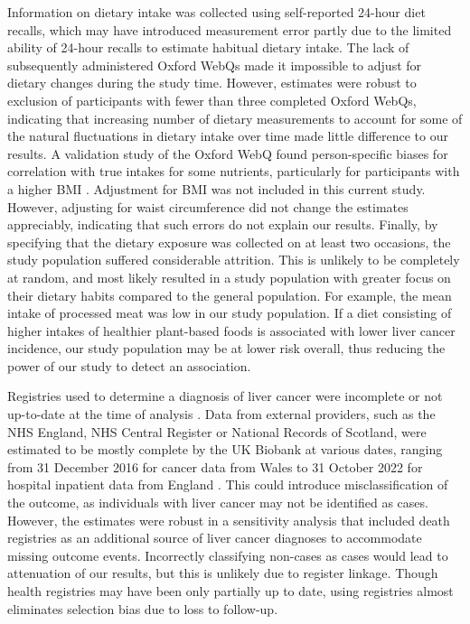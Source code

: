 \documentclass[
]{article}
\begin{document}
Information on dietary intake was collected using self-reported 24-hour
diet recalls, which may have introduced measurement error partly due to
the limited ability of 24-hour recalls to estimate habitual dietary
intake. The lack of subsequently administered Oxford WebQs made it
impossible to adjust for dietary changes during the study time. However,
estimates were robust to exclusion of participants with fewer than three
completed Oxford WebQs, indicating that increasing number of dietary
measurements to account for some of the natural fluctuations in dietary
intake over time made little difference to our results. A validation
study of the Oxford WebQ found person-specific biases for correlation
with true intakes for some nutrients, particularly for participants with
a higher BMI \autocite{Greenwood2019}. Adjustment for BMI was not included in
this current study. However, adjusting for waist circumference did not
change the estimates appreciably, indicating that such errors do not
explain our results. Finally, by specifying that the dietary exposure
was collected on at least two occasions, the study population suffered
considerable attrition. This is unlikely to be completely at random, and
most likely resulted in a study population with greater focus on their
dietary habits compared to the general population. For example, the mean
intake of processed meat was low in our study population. If a diet
consisting of higher intakes of healthier plant-based foods is
associated with lower liver cancer incidence, our study population may
be at lower risk overall, thus reducing the power of our study to detect
an association.

Registries used to determine a diagnosis of liver cancer were incomplete
or not up-to-date at the time of analysis \autocite{RN112}. Data from external
providers, such as the NHS England, NHS Central Register or National
Records of Scotland, were estimated to be mostly complete by the UK
Biobank at various dates, ranging from 31 December 2016 for cancer data
from Wales to 31 October 2022 for hospital inpatient data from England
\autocite{RN114}. This could introduce misclassification of the outcome, as
individuals with liver cancer may not be identified as cases. However,
the estimates were robust in a sensitivity analysis that included death
registries as an additional source of liver cancer diagnoses to
accommodate missing outcome events. Incorrectly classifying non-cases as
cases would lead to attenuation of our results, but this is unlikely due
to register linkage. Though health registries may have been only
partially up to date, using registries almost eliminates selection bias
due to loss to follow-up.
\end{document}
